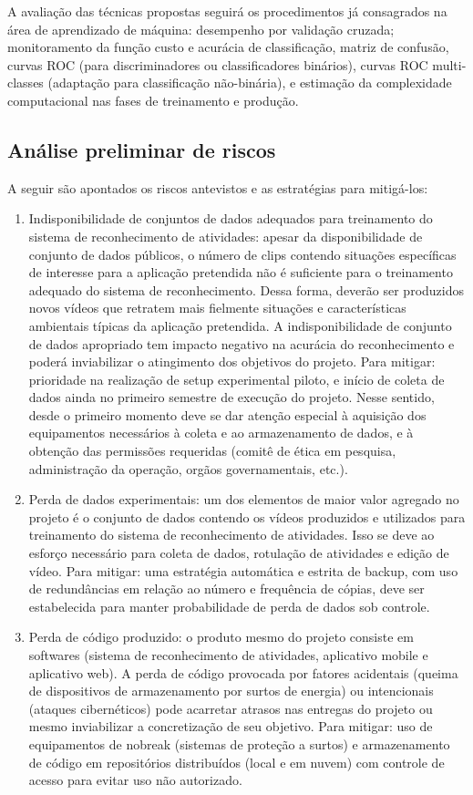 A avaliação das técnicas propostas seguirá os procedimentos já consagrados na área de aprendizado de máquina: desempenho por validação cruzada; monitoramento da função custo e acurácia de classificação, matriz de confusão, curvas ROC (para discriminadores ou classificadores binários), curvas ROC multi-classes (adaptação para classificação não-binária), e estimação da complexidade computacional nas fases de treinamento e produção. 


\subsection{Análise preliminar de riscos}
\label{ssec:risco}
A seguir são apontados os riscos antevistos e as estratégias para mitigá-los: 
\begin{enumerate}
	\item Indisponibilidade de conjuntos de dados adequados para treinamento do sistema de reconhecimento de atividades: apesar da disponibilidade de conjunto de dados públicos, o número de clips contendo situações específicas de interesse para a aplicação pretendida não é suficiente para o treinamento adequado do sistema de reconhecimento. Dessa forma, deverão ser produzidos novos vídeos que retratem mais fielmente situações e características ambientais típicas da aplicação pretendida. A indisponibilidade de conjunto de dados apropriado tem impacto negativo na acurácia do reconhecimento e poderá inviabilizar o atingimento dos objetivos do projeto. Para mitigar: prioridade na realização de setup experimental piloto, e início de coleta de dados ainda no primeiro semestre de execução do projeto. Nesse sentido, desde o primeiro momento deve se dar atenção especial à aquisição dos equipamentos necessários à coleta e ao armazenamento de dados, e à obtenção das permissões requeridas (comitê de ética em pesquisa, administração da operação, orgãos governamentais, etc.).
	\item Perda de dados experimentais: um dos elementos de maior valor agregado no projeto é o conjunto de dados contendo os vídeos produzidos e utilizados para treinamento do sistema de reconhecimento de atividades. Isso se deve ao esforço necessário para coleta de dados, rotulação de atividades e edição de vídeo. Para mitigar: uma estratégia automática e estrita de backup, com uso de redundâncias em relação ao número e frequência de cópias, deve ser estabelecida para manter probabilidade de perda de dados sob controle.
	\item Perda de código produzido: o produto mesmo do projeto consiste em softwares (sistema de reconhecimento de atividades, aplicativo mobile e aplicativo web). A perda de código provocada por fatores acidentais (queima de dispositivos de armazenamento por surtos de energia) ou intencionais (ataques cibernéticos) pode acarretar atrasos nas entregas do projeto ou mesmo inviabilizar a concretização de seu objetivo. Para mitigar: uso de equipamentos de nobreak (sistemas de proteção a surtos) e armazenamento de código em repositórios distribuídos (local e em nuvem) com controle de acesso para evitar uso não autorizado.

\end{enumerate}
